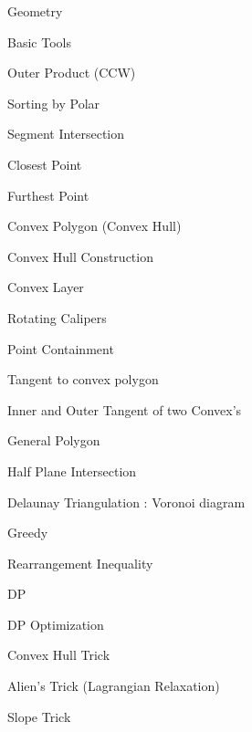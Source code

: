 \documentclass[landscape, 8pt, a4paper, oneside]{extarticle}
\begin{document}
\begin{multicols}{3}
\begin{tcolorbox}[breakable, enhanced, sharp corners, colback=white, colframe=black, boxrule=1pt, left=0pt]
\begin{IdeaNote}
\item Geometry
    \begin{IdeaNote}
    \item Basic Tools
        \begin{IdeaNote}
        \item Outer Product (CCW)
        \item Sorting by Polar
        \item Segment Intersection
        \item Closest Point
        \item Furthest Point
        \end{IdeaNote}
    \item Convex Polygon (Convex Hull)
        \begin{IdeaNote}
        \item Convex Hull Construction
        \item Convex Layer
        \item Rotating Calipers
        \item Point Containment
        \item Tangent to convex polygon
        \item Inner and Outer Tangent of two Convex's
        \end{IdeaNote}
    \item General Polygon
    \item Half Plane Intersection
    \item Delaunay Triangulation : Voronoi diagram
    \end{IdeaNote}


\item Greedy
    \begin{IdeaNote}
    \item Rearrangement Inequality
    \end{IdeaNote}

\item DP
    \begin{IdeaNote}
    \item DP Optimization
        \begin{IdeaNote}
        \item Convex Hull Trick
        \item Alien's Trick (Lagrangian Relaxation)
        \item Slope Trick
        \end{IdeaNote}
    \end{IdeaNote}


\end{IdeaNote}
\end{tcolorbox}
\end{multicols}
\end{document}
